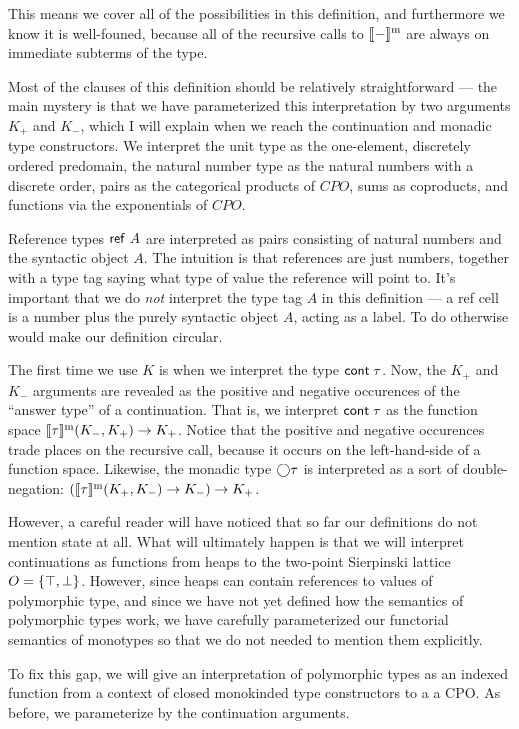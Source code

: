 This means we cover all of the possibilities in this definition, and
furthermore we know it is well-founed, because all of the recursive
calls to $[\![{-}]\!]^{\mathrm{m}}$ are always on immediate subterms of the
type.

Most of the clauses of this definition should be relatively
straightforward --- the main mystery is that we have parameterized this
interpretation by two arguments $K_+$ and $K_-$, which I will explain
when we reach the continuation and monadic type constructors. 
We interpret the unit type as the one-element, discretely ordered
predomain, the natural number type as the natural numbers with a
discrete order, pairs as the categorical products of $CPO$, sums as
coproducts, and functions via the exponentials of $CPO$.

Reference types $\mbox{\textsf{{ref }}}A$ are interpreted as pairs consisting of
natural numbers and the syntactic object $A$. The intuition is that
references are just numbers, together with a type tag saying what
type of value the reference will point to. It's important that we do 
\emph{not} interpret the type tag $A$ in this definition --- a ref cell
is a number plus the purely syntactic object $A$, acting as a label. 
To do otherwise would make our definition circular. 

The first time we use $K$ is when we interpret the type $\mbox{\textsf{{cont}}}\;{\tau}$.
Now, the $K_+$ and $K_-$ arguments are revealed as the positive and
negative occurences of the ``answer type'' of a continuation. That is,
we interpret $\mbox{\textsf{{cont}}}\;{\tau}$ as the function space
$[\![{\tau}]\!]^{\mathrm{m}}(K_-, K_+) \to K_+$.  Notice that the positive and
negative occurences trade places on the recursive call, because it
occurs on the left-hand-side of a function space. Likewise, the
monadic type $\bigcirc{\tau}$ is interpreted as a sort of
double-negation: $([\![{\tau}]\!]^{\mathrm{m}}(K_+, K_-) \to K_-) \to K_+$.

However, a careful reader will have noticed that so far our
definitions do not mention state at all. What will ultimately happen
is that we will interpret continuations as functions from heaps to the
two-point Sierpinski lattice $O = \{{\top, \bot}\}$. However, since
heaps can contain references to values of polymorphic type, and since
we have not yet defined how the semantics of polymorphic types work, we
have carefully parameterized our functorial semantics of monotypes so
that we do not needed to mention them explicitly. 

To fix this gap, we will give an interpretation of polymorphic types
as an indexed function from a context of closed monokinded type
constructors to a a CPO.  As before, we parameterize by the
continuation arguments.

